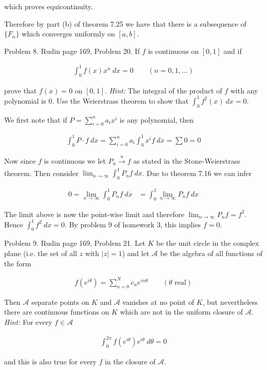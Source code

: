 \documentclass{article}
\begin{document}
  which proves equicontinuity.  

  Therefore by part (b) of theorem 7.25 we have that there is a subsequence of $\{F_n\}$ which converges uniformly on $[a,b]$.

\pagebreak
  
{\Large \color{Sepia} Problem 8. Rudin page 169, Problem 20. If $f$ is continuous on $[0,1]$ and if 

\begin{align*}
    \int_0^1 f(x) x^n \ dx = 0 \qquad (n=0,1,\dots)
\end{align*}

prove that $f(x)=0$ on $[0,1]$.  {\it Hint:} The integral of the product of $f$ with any polynomial is 0.  Use the Weierstrass theorem to show that $\int_0^1 f^2(x) \ dx = 0$.

}

\vspace{1cm} 

We first note that if $P=\sum_{i=0}^n a_ix^i$ is any polynomial, then 

\begin{align*}
  \int_0^1 P\cdot f \ dx = \sum_{i=0}^n a_i\int_0^1 x^i f \ dx = \sum 0 = 0
\end{align*}

Now since $f$ is continuous we let $P_n\xrightarrow[]{u} f$ as stated in the Stone-Weierstrass theorem.  Then consider $\lim_{n\to \infty}\int_0^1 P_nf \ dx$.  Due to theorem 7.16 we can infer 

\begin{align*}
  0=\lim_{n\to \infty}\int_0^1 P_nf \ dx &= \int_0^1 \lim_{n\to \infty}P_nf \ dx 
\end{align*}

The limit above is now the point-wise limit and therefore $\lim_{n\to \infty}P_nf = f^2$.  Hence $\int_0^1 f^2\ dx = 0$.  By problem 9 of homework 3, this implies $f=0$.  

 \pagebreak
 {\Large \color{Sepia} Problem 9. Rudin page 169, Problem 21. Let $K$ be the unit circle in the complex plane (i.e. the set of all $z$ with $|z|=1$) and let $\mathscr A$ be the algebra of all functions of the form 
 
 \begin{align*}
    f(e^{i\theta})=\sum_{n=0}^N c_n e^{in\theta} \qquad (\theta \text{ real})
 \end{align*}
 
 Then $\mathscr A$ separate points on $K$ and $\mathscr A$ vanishes at no point of $K$, but nevertheless there are continuous functions on $K$ which are not in the uniform closure of $\mathscr A$.  {\it Hint:} For every $f\in\mathscr A$ 

 \begin{align*}
   \int_0^{2\pi} f(e^{i\theta})e^{i\theta}\ d\theta = 0
 \end{align*}

 and this is also true for every $f$ in the closure of $\mathscr A$.
 
 }
\end{document}
